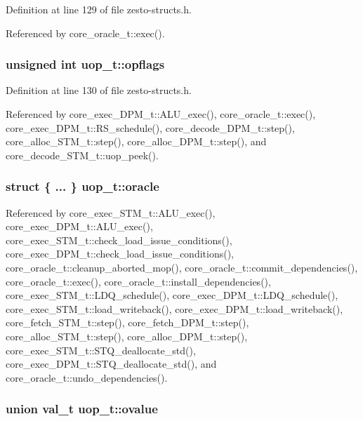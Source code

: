 Definition at line 129 of file zesto-structs.h.

Referenced by core\_\-oracle\_\-t::exec().
\subsubsection[{opflags}]{\setlength{\rightskip}{0pt plus 5cm}unsigned int {\bf uop\_\-t::opflags}}\label{structuop__t_049e7e1cae99e04134e75e9f7f300a7b}




Definition at line 130 of file zesto-structs.h.

Referenced by core\_\-exec\_\-DPM\_\-t::ALU\_\-exec(), core\_\-oracle\_\-t::exec(), core\_\-exec\_\-DPM\_\-t::RS\_\-schedule(), core\_\-decode\_\-DPM\_\-t::step(), core\_\-alloc\_\-STM\_\-t::step(), core\_\-alloc\_\-DPM\_\-t::step(), and core\_\-decode\_\-STM\_\-t::uop\_\-peek().
\subsubsection[{oracle}]{\setlength{\rightskip}{0pt plus 5cm}struct \{ ... \}   {\bf uop\_\-t::oracle}}\label{structuop__t_8e4a2982dc7dcc8eb4f22d8d16a9ab1b}




Referenced by core\_\-exec\_\-STM\_\-t::ALU\_\-exec(), core\_\-exec\_\-DPM\_\-t::ALU\_\-exec(), core\_\-exec\_\-STM\_\-t::check\_\-load\_\-issue\_\-conditions(), core\_\-exec\_\-DPM\_\-t::check\_\-load\_\-issue\_\-conditions(), core\_\-oracle\_\-t::cleanup\_\-aborted\_\-mop(), core\_\-oracle\_\-t::commit\_\-dependencies(), core\_\-oracle\_\-t::exec(), core\_\-oracle\_\-t::install\_\-dependencies(), core\_\-exec\_\-STM\_\-t::LDQ\_\-schedule(), core\_\-exec\_\-DPM\_\-t::LDQ\_\-schedule(), core\_\-exec\_\-STM\_\-t::load\_\-writeback(), core\_\-exec\_\-DPM\_\-t::load\_\-writeback(), core\_\-fetch\_\-STM\_\-t::step(), core\_\-fetch\_\-DPM\_\-t::step(), core\_\-alloc\_\-STM\_\-t::step(), core\_\-alloc\_\-DPM\_\-t::step(), core\_\-exec\_\-STM\_\-t::STQ\_\-deallocate\_\-std(), core\_\-exec\_\-DPM\_\-t::STQ\_\-deallocate\_\-std(), and core\_\-oracle\_\-t::undo\_\-dependencies().
\subsubsection[{ovalue}]{\setlength{\rightskip}{0pt plus 5cm}union {\bf val\_\-t} {\bf uop\_\-t::ovalue}\hspace{0.3cm}{\tt  [write]}}\label{structuop__t_ed68709816c544662f377435b3c3fadb}




